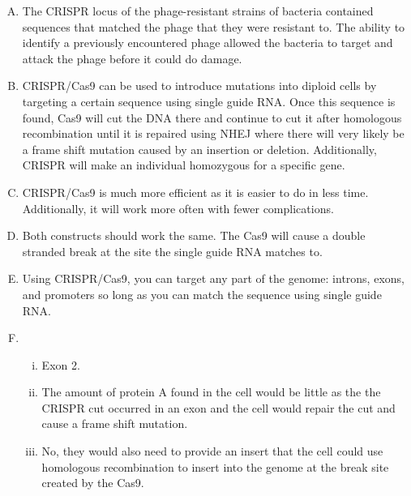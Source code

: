 \documentclass{article}
\begin{document}
\begin{enumerate}[A.]
    \item The CRISPR locus of the phage-resistant strains of bacteria contained
        sequences that matched the phage that they were resistant to. The
        ability to identify a previously encountered phage allowed the bacteria
        to target and attack the phage before it could do damage.
    
    \item CRISPR/Cas9 can be used to introduce mutations into diploid cells by
        targeting a certain sequence using single guide RNA. Once this sequence
        is found, Cas9 will cut the DNA there and continue to cut it after
        homologous recombination until it is repaired using NHEJ where there
        will very likely be a frame shift mutation caused by an insertion or
        deletion. Additionally, CRISPR will make an individual homozygous for a
        specific gene.
    
    \item CRISPR/Cas9 is much more efficient as it is easier to do in less time.
        Additionally, it will work more often with fewer complications.
    
    \item Both constructs should work the same. The Cas9 will cause a double
        stranded break at the site the single guide RNA matches to.
    
    \item Using CRISPR/Cas9, you can target any part of the genome: introns,
        exons, and promoters so long as you can match the sequence using single
        guide RNA.
    
    \item 
        \begin{enumerate}[i.]
            \item Exon 2.
            
            \item The amount of protein A found in the cell would be little as
                the the CRISPR cut occurred in an exon and the cell would repair
                the cut and cause a frame shift mutation.
            
            \item No, they would also need to provide an insert that the cell
                could use homologous recombination to insert into the genome at
                the break site created by the Cas9.
        \end{enumerate}
\end{enumerate}
\end{document}
